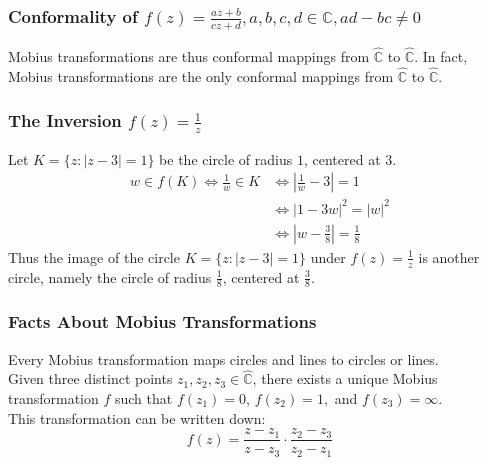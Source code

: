 \documentclass{article}
\begin{document}
\subsubsection{Conformality of $f(z) = \frac{az + b}{cz + d}, a, b, c, d \in \mathbb{C}, ad - bc \neq 0$}
Mobius transformations are thus conformal mappings from $\hat{\mathbb{C}}$ to $\hat{\mathbb{C}}$. In fact, Mobius transformations are the only conformal mappings from $\hat{\mathbb{C}}$ to $\hat{\mathbb{C}}$.

\subsubsection{The Inversion $f(z) = \frac{1}{z}$}
Let $K = \{z : \left|z - 3\right| = 1 \}$ be the circle of radius $1$, centered at $3$.
\begin{align*}
w \in f(K) \iff \frac{1}{w} \in K &\iff \left| \frac{1}{w} - 3 \right| = 1\\
&\iff \left|1 - 3w\right|^2 = \left|w\right|^2\\
&\iff \left|w - \frac{3}{8} \right| = \frac{1}{8}
\end{align*}
Thus the image of the circle $K = \{z : \left|z - 3\right| = 1 \}$ under $f(z) = \frac{1}{z}$ is another circle, namely the circle of radius $\frac{1}{8}$, centered at $\frac{3}{8}$.
\begin{figure}[h]
\centering
{}
\end{figure}

\subsubsection{Facts About Mobius Transformations}
Every Mobius transformation maps circles and lines to circles or lines.\\
Given three distinct points $z_1, z_2, z_3 \in \hat{\mathbb{C}}$, there exists a unique Mobius transformation $f$ such that $f(z_1) = 0$, $f(z_2) = 1,$ and $f(z_3) = \infty$.\\
This transformation can be written down:
\begin{equation*}
f(z) = \frac{z - z_1}{z - z_3} \cdot \frac{z_2 - z_3}{z_2 - z_1}
\end{equation*}
\end{document}
